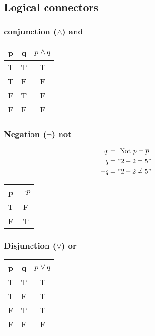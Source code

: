 \documentclass{article}
\begin{document}
\subsection{Logical connectors}
\subsubsection{conjunction ($\land$) and}
\begin{table}[h!]
    \begin{center}
        \begin{tabular}{c|c|c}
            p & q & $p \land q$ \\
            \hline
            T & T & T           \\
            T & F & F           \\
            F & T & F           \\
            F & F & F
        \end{tabular}
    \end{center}
\end{table}
\subsubsection{Negation ($\lnot$) not}
\begin{align*}
    \lnot p & = \text{ Not } p = \overline{p} \\
    q       & = "2+2=5"                       \\
    \lnot q & = "2+2 \neq 5"
\end{align*}
\begin{table}[h!]
    \begin{center}
        \begin{tabular}{c|c}
            p & $\lnot p$ \\
            \hline
            T & F         \\
            F & T
        \end{tabular}
    \end{center}
\end{table}
\subsubsection{Disjunction ($\lor$) or}
\begin{table}[h!]
    \begin{center}
        \begin{tabular}{c|c|c}
            p & q & $p\lor q$ \\
            \hline
            T & T & T         \\
            T & F & T         \\
            F & T & T         \\
            F & F & F
        \end{tabular}
    \end{center}
\end{table}
\end{document}
